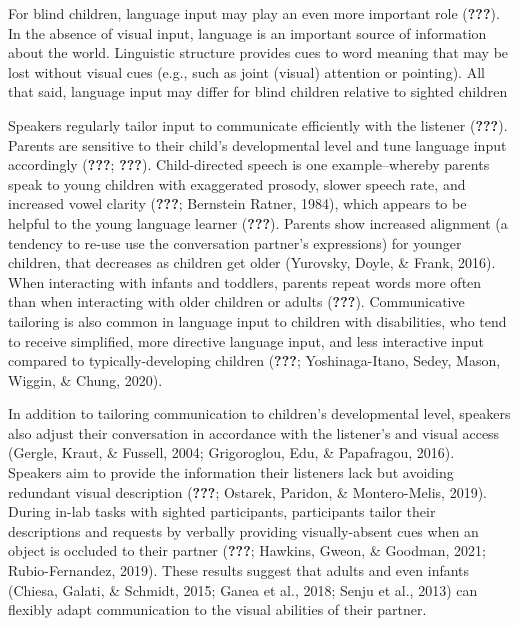 \documentclass[english,man]{apa6}
\begin{document}
For blind children, language input may play an even more important role ({\textbf{???}}). In the absence of visual input, language is an important source of information about the world. Linguistic structure provides cues to word meaning that may be lost without visual cues (e.g., such as joint (visual) attention or pointing). All that said, language input may differ for blind children relative to sighted children

Speakers regularly tailor input to communicate efficiently with the listener ({\textbf{???}}). Parents are sensitive to their child's developmental level and tune language input accordingly ({\textbf{???}}; {\textbf{???}}). Child-directed speech is one example--whereby parents speak to young children with exaggerated prosody, slower speech rate, and increased vowel clarity ({\textbf{???}}; Bernstein Ratner, 1984), which appears to be helpful to the young language learner ({\textbf{???}}). Parents show increased alignment (a tendency to re-use use the conversation partner's expressions) for younger children, that decreases as children get older (Yurovsky, Doyle, \& Frank, 2016). When interacting with infants and toddlers, parents repeat words more often than when interacting with older children or adults ({\textbf{???}}). Communicative tailoring is also common in language input to children with disabilities, who tend to receive simplified, more directive language input, and less interactive input compared to typically-developing children ({\textbf{???}}; Yoshinaga-Itano, Sedey, Mason, Wiggin, \& Chung, 2020).

In addition to tailoring communication to children's developmental level, speakers also adjust their conversation in accordance with the listener's and visual access (Gergle, Kraut, \& Fussell, 2004; Grigoroglou, Edu, \& Papafragou, 2016). Speakers aim to provide the information their listeners lack but avoiding redundant visual description ({\textbf{???}}; Ostarek, Paridon, \& Montero-Melis, 2019). During in-lab tasks with sighted participants, participants tailor their descriptions and requests by verbally providing visually-absent cues when an object is occluded to their partner ({\textbf{???}}; Hawkins, Gweon, \& Goodman, 2021; Rubio-Fernandez, 2019). These results suggest that adults and even infants (Chiesa, Galati, \& Schmidt, 2015; Ganea et al., 2018; Senju et al., 2013) can flexibly adapt communication to the visual abilities of their partner.
\end{document}
